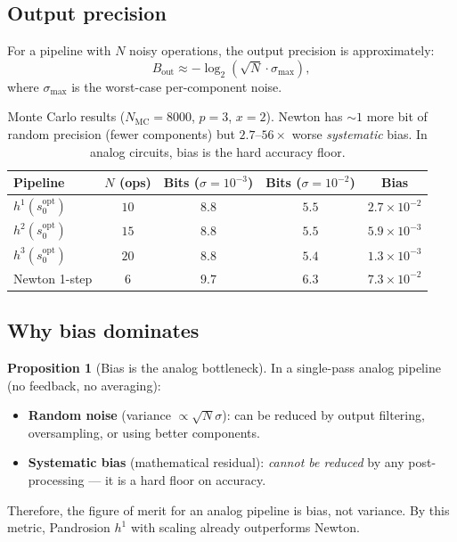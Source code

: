 \documentclass[11pt,a4paper]{article}
\theoremstyle{definition}
\newtheorem{proposition}{Proposition}[section]
\begin{document}
\subsection{Output precision}

For a pipeline with $N$ noisy operations, the output precision is approximately:
\begin{equation}
  B_{\text{out}} \approx -\log_2\!\left(\sqrt{N} \cdot \sigma_{\max}\right),
\end{equation}
where $\sigma_{\max}$ is the worst-case per-component noise.

\begin{table}[H]
\centering
\begin{tabular}{lcccc}
\toprule
\textbf{Pipeline} & $N$ \textbf{(ops)} & \textbf{Bits} ($\sigma = 10^{-3}$) & \textbf{Bits} ($\sigma = 10^{-2}$) & \textbf{Bias} \\
\midrule
$h^1(s_0^{\mathrm{opt}})$ & $10$ & $8.8$ & $5.5$ & $2.7 \times 10^{-2}$ \\
$h^2(s_0^{\mathrm{opt}})$ & $15$ & $8.8$ & $5.5$ & $5.9 \times 10^{-3}$ \\
$h^3(s_0^{\mathrm{opt}})$ & $20$ & $8.8$ & $5.4$ & $1.3 \times 10^{-3}$ \\
\midrule
Newton 1-step & $6$ & $9.7$ & $6.3$ & $7.3 \times 10^{-2}$ \\
\bottomrule
\end{tabular}
\caption{Monte Carlo results ($N_{\text{MC}} = 8000$, $p = 3$, $x = 2$).  Newton has $\sim 1$ more bit of random precision (fewer components) but $2.7$--$56\times$ worse \emph{systematic} bias.  In analog circuits, bias is the hard accuracy floor.}
\label{tab:mc_results}
\end{table}

\subsection{Why bias dominates}

\begin{proposition}[Bias is the analog bottleneck]
\label{prop:bias_bottleneck}
In a single-pass analog pipeline (no feedback, no averaging):
\begin{itemize}
  \item \textbf{Random noise} (variance $\propto \sqrt{N}\sigma$): can be reduced by output filtering, oversampling, or using better components.
  \item \textbf{Systematic bias} (mathematical residual): \emph{cannot be reduced} by any post-processing --- it is a hard floor on accuracy.
\end{itemize}
Therefore, the figure of merit for an analog pipeline is bias, not variance.  By this metric, Pandrosion $h^1$ with scaling already outperforms Newton.
\end{proposition}
\end{document}
